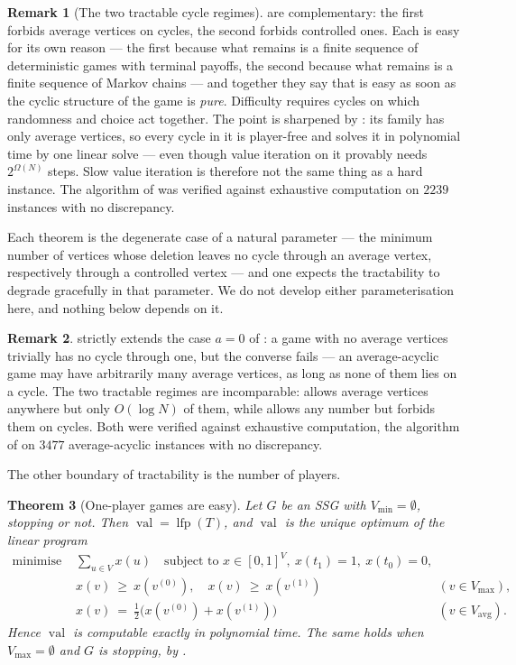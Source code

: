 \documentclass[11pt]{article}
\theoremstyle{plain}
\newtheorem{theorem}{Theorem}[section]
\theoremstyle{definition}
\newtheorem{remark}[theorem]{Remark}
\DeclareMathOperator{\val}{val}
\DeclareMathOperator{\lfp}{lfp}
\newcommand{\Vmax}{V_{\max}}
\newcommand{\Vmin}{V_{\min}}
\newcommand{\Vavg}{V_{\mathrm{avg}}}
\begin{document}
\begin{remark}[The two tractable cycle regimes]\label{rem:two-regimes}
 are complementary:
the first forbids average vertices on cycles, the second forbids
controlled ones. Each is easy for its own reason --- the first because
what remains is a finite sequence of deterministic games with terminal
payoffs, the second because what remains is a finite sequence of Markov
chains --- and together they say that  is easy as soon as
the cyclic structure of the game is \emph{pure}. Difficulty requires
cycles on which randomness and choice act together. The point is sharpened
by : its family has only average vertices, so every
cycle in it is player-free and  solves it in
polynomial time by one linear solve --- even though value iteration on it
provably needs $2^{\Omega(N)}$ steps. Slow value iteration is therefore
not the same thing as a hard instance. The algorithm of
 was verified against exhaustive computation on
$2239$ instances with no discrepancy.

Each theorem is the degenerate case of a natural parameter --- the
minimum number of vertices whose deletion leaves no cycle through an
average vertex, respectively through a controlled vertex --- and one
expects the tractability to degrade gracefully in that parameter. We do
not develop either parameterisation here, and nothing below depends on
it.
\end{remark}

\begin{remark}
 strictly extends the case $a=0$ of
: a game with no average vertices trivially has no
cycle through one, but the converse fails --- an average-acyclic game may
have arbitrarily many average vertices, as long as none of them lies on a
cycle. The two tractable regimes are incomparable: 
allows average vertices anywhere but only $O(\log N)$ of them, while
 allows any number but forbids them on cycles.
Both were verified against exhaustive computation, the algorithm of
 on $3477$ average-acyclic instances with no
discrepancy.
\end{remark}

The other boundary of tractability is the number of players.

\begin{theorem}[One-player games are easy]\label{thm:one-player}
Let $G$ be an SSG with $\Vmin=\emptyset$, stopping or not. Then
$\val=\lfp(T)$, and $\val$ is the unique optimum of the linear program
\[
\begin{aligned}
  \text{minimise } &\textstyle\sum_{u\in V}x(u)\quad\text{subject to } x\in[0,1]^V,\ x(t_1)=1,\ x(t_0)=0,\\
  &x(v)\ \ge\ x(v^{(0)}),\quad x(v)\ \ge\ x(v^{(1)}) && (v\in\Vmax),\\
  &x(v)\ =\ \tfrac12\bigl(x(v^{(0)})+x(v^{(1)})\bigr) && (v\in\Vavg).
\end{aligned}
\]
Hence $\val$ is computable exactly in polynomial time. The same holds
when $\Vmax=\emptyset$ and $G$ is stopping, by .
\end{theorem}
\end{document}
